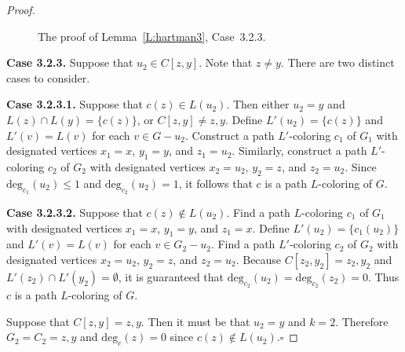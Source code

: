 \documentclass[12pt,letterpaper]{article}
\theoremstyle{plain}
\theoremstyle{definition}
\theoremstyle{break}
\newcommand{\ggcqedsymbol}{$\square$}
\newcommand{\ggcqed}{\hbox{}\nobreak\hbox{\quad\ggcqedsymbol}}
\newcommand{\ggcnopf}{\ggcqed}
\begin{document}
\begin{proof}
\begin{figure}[ht]
\begin{center}
    \caption{The proof of Lemma~\ref{L:hartman3}, Case~3.2.3.}
\end{center}
\end{figure}

\textbf{Case 3.2.3.}
Suppose that $u_2\in C[z,y]$. Note that $z\ne y$. There are two distinct cases to consider.

\textbf{Case 3.2.3.1.} Suppose that $c(z)\in L(u_2)$. Then 
either $u_2=y$ and $L(z)\cap L(y)=\{c(z)\}$, or $C[z,y]\ne z,y$.
Define $L'(u_2)=\{c(z)\}$
and $L'(v)=L(v)$ for each $v\in G-u_2$. Construct a path $L'$-coloring $c_1$ of $G_1$
with designated vertices $x_1=x$,
$y_1=y$, and $z_1=u_2$. Similarly, construct a path $L'$-coloring $c_2$ of
$G_2$ with designated vertices $x_2=u_2$, $y_2=z$, and $z_2=u_2$. Since
$\text{deg}_{c_1}(u_2)\le 1$ and $\text{deg}_{c_2}(u_2)=1$, it follows
that $c$ is a path $L$-coloring of $G$.

\textbf{Case 3.2.3.2.} Suppose that $c(z)\not\in L(u_2)$. Find a path $L$-coloring
$c_1$ of $G_1$ with designated vertices
$x_1=x$, $y_1=y$, and $z_1=x$. Define $L'(u_2)=\{c_1(u_2)\}$ and $L'(v)=L(v)$
for each $v\in G_2-u_2$. Find a path $L'$-coloring $c_2$ of $G_2$
with designated vertices $x_2=u_2$, $y_2=z$, and $z_2=u_2$. Because
$C[z_2,y_2]=z_2,y_2$ and $L'(z_2)\cap L'(y_2)=\emptyset$, it is
guaranteed that $\text{deg}_{c_2}(u_2)=\text{deg}_{c_2}(z_2)=0$. Thus
$c$ is a path $L$-coloring of $G$.

Suppose that $C[z,y]=z,y$. Then it must be that $u_2=y$ and $k=2$.
Therefore $G_2=C_2=z,y$ and $\text{deg}_c(z)=0$ since
$c(z)\not\in L(u_2)$.\ggcnopf
\end{proof}
\end{document}
